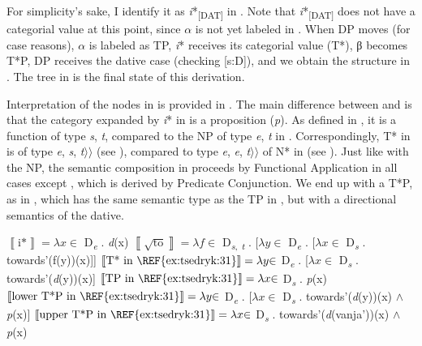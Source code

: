 \documentclass[output=paper,colorlinks,citecolor=brown,nonflat]{./langscibook}
\begin{document}
For simplicity’s sake, I identify it as \textit{i}*\textsubscript{[DAT]} in . Note that \textit{i}*\textsubscript{[DAT]} does not have a categorial value at this point, since ${\alpha}$ is not yet labeled in . When DP moves (for case reasons), ${\alpha}$ is labeled as TP, \textit{i}* receives its categorial value (T*), β becomes T*P, DP receives the dative case (checking [s:D]), and we obtain the structure in . The tree in  is the final state of this derivation.

Interpretation of the nodes in  is provided in . The main difference between  and  is that the category expanded by \textit{i}* in  is a proposition (\textit{p}). As defined in , it is a function of type {\textlangle}\textit{s}, \textit{t}{\textrangle}, compared to the NP of type {\textlangle}\textit{e}, \textit{t}{\textrangle} in . Correspondingly, T* in  is of type {\textlangle}\textit{e}, {\textlangle}\textit{s}, \textit{t}${\rangle}{\rangle}$ (see ), compared to type {\textlangle}\textit{e}, {\textlangle}\textit{e}, \textit{t}${\rangle}{\rangle}$ of N* in  (see ). Just like with the NP, the semantic composition in  proceeds by Functional Application in all cases except , which is derived by Predicate Conjunction. We end up with a T*P, as in , which has the same semantic type as the TP in , but with a directional semantics of the dative.     
 
\ea%
    \label{ex:tsedryk:34}
    \ea\label{ex:tsedryk:34a}
    $\left\llbracket \text{i*}\right\rrbracket  = {\lambda}x {\in}$ D\textit{\textsubscript{e}} . \textit{d}(x) 
    \ex\label{ex:tsedryk:34b}
    $\left\llbracket \sqrt{\text{to}}\right\rrbracket  = {\lambda}f {\in}$ D\textsubscript{{\textlangle}}\textit{\textsubscript{s}}\textsubscript{,} \textit{\textsubscript{t}}\textsubscript{{\textrangle}} . [${\lambda}y {\in}$ D\textit{\textsubscript{e}} . [${\lambda}x {\in}$ D\textit{\textsubscript{s}} . towards'(f(y))(x)]] 
    \ex\label{ex:tsedryk:34c}
    $\left\llbracket \text{T* in \REF{ex:tsedryk:31}}\right\rrbracket  = {\lambda}y {\in}$ D\textit{\textsubscript{e}} . [${\lambda}x {\in}$ D\textit{\textsubscript{s}} . towards'(\textit{d}(y))(x)] 
    \ex\label{ex:tsedryk:34d}
    $\left\llbracket \text{TP in \REF{ex:tsedryk:31}}\right\rrbracket  = {\lambda}x {\in}$ D\textit{\textsubscript{s}} . \textit{p}(x) 
    \ex\label{ex:tsedryk:34e}
    $\left\llbracket \text{lower T*P in \REF{ex:tsedryk:31}}\right\rrbracket  = {\lambda}y {\in}$ D\textit{\textsubscript{e}} . [${\lambda}x {\in}$ D\textit{\textsubscript{s}} . towards'(\textit{d}(y))(x) ${\wedge}$ \textit{p}(x)]
    \ex\label{ex:tsedryk:34f}
    $\left\llbracket \text{upper T*P in \REF{ex:tsedryk:31}}\right\rrbracket  = {\lambda}x {\in}$ D\textit{\textsubscript{s}} . towards'(\textit{d}(vanja'))(x) ${\wedge}$ \textit{p}(x)
    \z
\z
\end{document}
